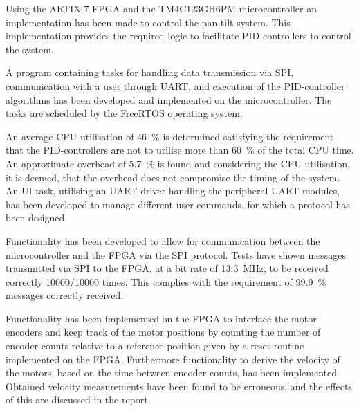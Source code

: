 \documentclass[../../main.tex]{subfiles}
\begin{document}

Using the ARTIX-7 FPGA and the TM4C123GH6PM microcontroller an implementation has been made to control the pan-tilt system. This implementation provides the required logic to facilitate PID-controllers to control the system.  

 

A program containing tasks for handling data transmission via SPI, communication with a user through UART, and execution of the PID-controller algorithms has been developed and implemented on the microcontroller. The tasks are scheduled by the FreeRTOS operating system.

An average CPU utilisation of \SI{46}{\percent} is determined satisfying the requirement that the PID-controllers are not to utilise more than \SI{60}{\percent} of the total CPU time. An approximate overhead of \SI{5,7}{\percent} is found and considering the CPU utilisation, it is deemed, that the overhead does not compromise the timing of the system. An UI task, utilising an UART driver handling the peripheral UART modules, has been developed to manage different user commands, for which a protocol has been designed.

Functionality has been developed to allow for communication between the microcontroller and the FPGA via the SPI protocol. 
Tests have shown messages transmitted via SPI to the FPGA, at a bit rate of \SI{13.3}{\mega\hertz}, to be received correctly 10000/10000 times. This complies with the requirement of \SI{99,9}{\percent} messages correctly received.

Functionality has been implemented on the FPGA to interface the motor encoders and keep track of the motor positions by counting the number of encoder counts relative to a reference position given by a reset routine implemented on the FPGA. Furthermore functionality to derive the velocity of the motors, based on the time between encoder counts, has been implemented.
Obtained velocity measurements have been found to be erroneous, and the effects of this are discussed in the report.   
\end{document}
